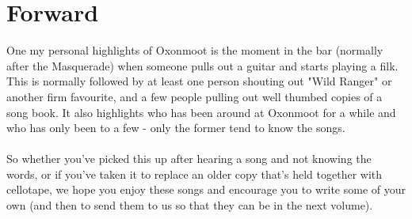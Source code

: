 \section{Forward}
One my personal highlights of Oxonmoot is the moment in the bar (normally after the Masquerade) when someone pulls out a guitar and starts playing a filk. This is normally followed by at least one person shouting out "Wild Ranger" or another firm favourite, and a few people pulling out well thumbed copies of a song book. It also highlights who has been around at Oxonmoot for a while and who has only been to a few - only the former tend to know the songs. 
\\
\\
So whether you've picked this up after hearing a song and not knowing the words, or if you've taken it to replace an older copy that's held together with cellotape, we hope you enjoy these songs and encourage you to write some of your own (and then to send them to us so that they can be in the next volume).
\\
 